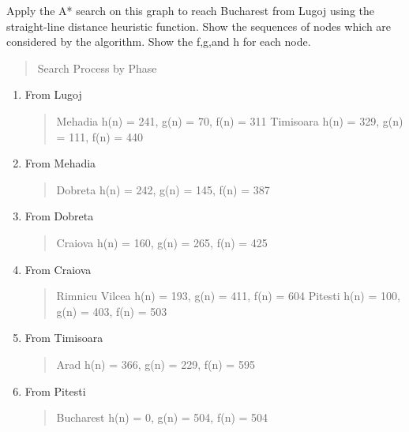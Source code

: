 \documentclass[11pt]{article}
\newenvironment{problem}[2][Problem]{\begin{trivlist}
\item[\hskip \labelsep {\bfseries #1}\hskip \labelsep {\bfseries #2.}]}{\end{trivlist}}
\begin{document}
\begin{problem}{2}
Apply the A* search on this graph to reach Bucharest from Lugoj using the straight-line distance heuristic function. Show the sequences of nodes which are considered by the algorithm. Show the f,g,and h for each node.
\begin{verse}
	Search Process by Phase
\end{verse}
\begin{enumerate}[label={Phase \Roman*},leftmargin=1.25in]
	\item [Phase 1] From Lugoj
		\begin{verse}
			Mehadia h(n) = 241, g(n) = 70, f(n) = 311
			Timisoara h(n) = 329, g(n) = 111, f(n) = 440
		\end{verse}
	\item [Phase 2] From Mehadia
		\begin{verse}
			Dobreta h(n) = 242, g(n) = 145, f(n) = 387
		\end{verse}
	\item [Phase 3] From Dobreta
		\begin{verse}
			Craiova h(n) = 160, g(n) = 265, f(n) = 425
		\end{verse}
	\item [Phase 4] From Craiova
		\begin{verse}
			Rimnicu Vilcea h(n) = 193, g(n) = 411, f(n) = 604
			Pitesti h(n) = 100, g(n) = 403, f(n) = 503
		\end{verse}
	\item [Phase 5] From Timisoara
		\begin{verse}
			Arad h(n) = 366, g(n) = 229, f(n) = 595
		\end{verse}
	\item [Phase 6] From Pitesti
		\begin{verse}
			Bucharest h(n) = 0, g(n) = 504, f(n) = 504
		\end{verse}
\end{enumerate}
\end{problem}
\end{document}
